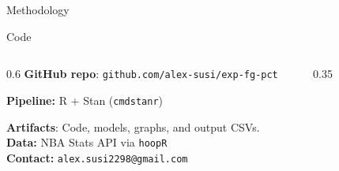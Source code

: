 \documentclass[final]{beamer}
\newlength{\gutterwid}
\newlength{\onecolwid}
\begin{document}
\begin{frame}[t]
\begin{columns}[t,totalwidth=\textwidth]
\begin{column}{\onecolwid}
\begin{block}{Methodology}
\end{block}




\begin{alertblock}{Code}
\begin{columns}[T]
  \begin{column}{0.6\linewidth}
  \vspace{2ex}
    \textbf{GitHub repo}: \texttt{github.com/alex-susi/exp-fg-pct} \\

    \vspace{2ex}

    \textbf{Pipeline:} R + Stan (\texttt{cmdstanr}) \\
    \vspace{2ex}
    
    \textbf{Artifacts}: Code, models, graphs, and output CSVs. \\
    \vspace{2ex}
    \textbf{Data:} NBA Stats API via \texttt{hoopR} \\
    \vspace{2ex}
    \textbf{Contact:} \texttt{alex.susi2298@gmail.com}


  \end{column}
  \begin{column}{0.35\linewidth}
    \centering
  \end{column}
\end{columns}
\end{alertblock}




\end{column}

\begin{column}{\gutterwid}\end{column}


\end{columns}
\end{frame}
\end{document}

